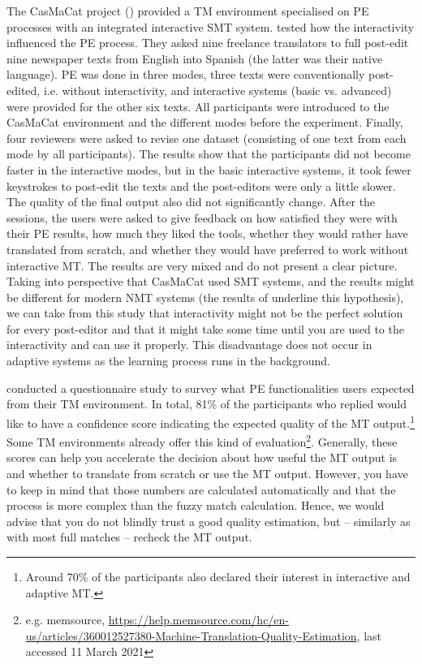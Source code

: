 The CasMaCat project (\citealt{alabau2014casmacat}) provided a TM environment specialised on PE processes with an integrated interactive SMT system. \citet{sanchis2014interactive} tested how the interactivity influenced the PE process. They asked nine freelance translators to full post-edit nine newspaper texts from English into Spanish (the latter was their native language). PE was done in three modes, three texts were conventionally post-edited, i.e. without interactivity, and interactive systems (basic vs. advanced) were provided for the other six texts. All participants were introduced to the CasMaCat environment and the different modes before the experiment. Finally, four reviewers were asked to revise one dataset (consisting of one text from each mode by all participants). The results show that the participants did not become faster in the interactive modes, but in the basic interactive systems, it took fewer keystrokes to post-edit the texts and the post-editors were only a little slower. The quality of the final output also did not significantly change.
After the sessions, the users were asked to give feedback on how satisfied they were with their PE results, how much they liked the tools, whether they would rather have translated from scratch, and whether they would have preferred to work without interactive MT. The results are very mixed and do not present a clear picture.
Taking into perspective that CasMaCat used SMT systems, and the results might be different for modern NMT systems (the results of \citealt{peris2019online} underline this hypothesis), we can take from this study that interactivity might not be the perfect solution for every post-editor and that it might take some time until you are used to the interactivity and can use it properly. This disadvantage does not occur in adaptive systems as the learning process runs in the background.
 

\citet{moorkens2017assessing} conducted a questionnaire study to survey what PE functionalities users expected from their TM environment. In total, 81\% of the participants who replied would like to have a confidence score indicating the expected quality of the MT output.\footnote{Around 70\% of the participants also declared their interest in interactive and adaptive MT.} Some TM environments already offer this kind of evaluation\footnote{e.g. memsource, \url{https://help.memsource.com/hc/en-us/articles/360012527380-Machine-Translation-Quality-Estimation}, last accessed 11 March 2021}. Generally, these scores can help you accelerate the decision about how useful the MT output is and whether to translate from scratch or use the MT output. However, you have to keep in mind that those numbers are calculated automatically and that the process is more complex than the fuzzy match calculation. Hence, we would advise that you do not blindly trust a good quality estimation, but -- similarly as with most full matches -- recheck the MT output.


